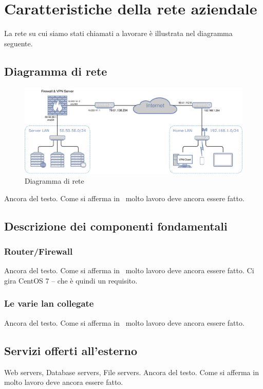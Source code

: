 \section{Caratteristiche della rete aziendale}
La rete su cui siamo stati chiamati a lavorare è illustrata nel diagramma seguente.
\subsection{Diagramma di rete}
\begin{figure}
    \centering
    \includegraphics[width=14cm]{figure/networkDiagram.pdf}
    \caption{Diagramma di rete}
\end{figure}

Ancora del testo. Come si afferma in~\cite{jones96analysis} molto lavoro deve ancora essere fatto.

\subsection{Descrizione dei componenti fondamentali}
\subsubsection{Router/Firewall}
Ancora del testo. Come si afferma in~\cite{jones96analysis} molto lavoro deve ancora essere fatto.
Ci gira CentOS 7 -- che è quindi un requisito.

\subsubsection{Le varie lan collegate}
Ancora del testo. Come si afferma in~\cite{jones96analysis} molto lavoro deve ancora essere fatto.


\subsection{Servizi offerti all'esterno}

Web servers, Database servers, File servers. Ancora del testo. Come si afferma in~\cite{jones96analysis} molto lavoro deve ancora essere fatto.
